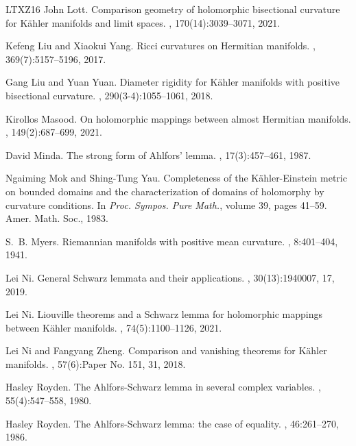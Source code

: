\documentclass[12pt]{amsart}
\theoremstyle{plain}
\theoremstyle{definition}
\renewcommand{\>}{\rightarrow}
\numberwithin{equation}{section} %
\begin{document}
\begin{thebibliography}{LTXZ16}
	John Lott.
	\newblock Comparison geometry of holomorphic bisectional curvature for {K}\"ahler manifolds and limit spaces.
	, 170(14):3039--3071, 2021.
	
	Kefeng Liu and Xiaokui Yang.
	\newblock Ricci curvatures on {H}ermitian manifolds.
	, 369(7):5157--5196, 2017.
	
	Gang Liu and Yuan Yuan.
	\newblock Diameter rigidity for {K}\"ahler manifolds with positive bisectional curvature.
	, 290(3-4):1055--1061, 2018.
	
	Kirollos Masood.
	\newblock On holomorphic mappings between almost {H}ermitian manifolds.
	, 149(2):687--699, 2021.
	
	David Minda.
	\newblock The strong form of {A}hlfors' lemma.
	, 17(3):457--461, 1987.
	
	Ngaiming Mok and Shing-Tung Yau.
	\newblock Completeness of the K\"ahler-Einstein metric on bounded domains and the characterization of domains of holomorphy by curvature conditions.
	\newblock In {\em Proc. Sympos. Pure Math.}, volume 39, pages 41--59. Amer. Math. Soc., 1983.
	
	S.~B. Myers.
	\newblock Riemannian manifolds with positive mean curvature.
	, 8:401--404, 1941.
	
	Lei Ni.
	\newblock General {S}chwarz lemmata and their applications.
	, 30(13):1940007, 17, 2019.
	
	Lei Ni.
	\newblock Liouville theorems and a {S}chwarz lemma for holomorphic mappings between {K}\"ahler manifolds.
	, 74(5):1100--1126, 2021.
	
	Lei Ni and Fangyang Zheng.
	\newblock Comparison and vanishing theorems for {K}\"ahler manifolds.
	, 57(6):Paper No. 151, 31, 2018.
	
	Hasley Royden.
	\newblock The {A}hlfors-{S}chwarz lemma in several complex variables.
	, 55(4):547--558, 1980.
	
	Hasley Royden.
	\newblock The {A}hlfors-{S}chwarz lemma: the case of equality.
	, 46:261--270, 1986.
	

\end{thebibliography}
\end{document}
